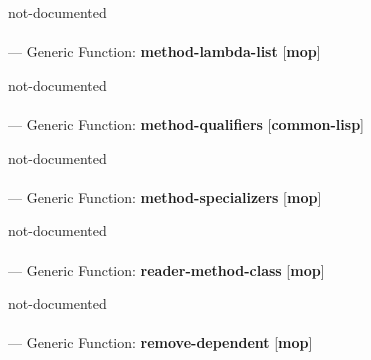 \begin{adjustwidth}{5em}{5em}
not-documented
\end{adjustwidth}

\paragraph{}
\label{MOP:METHOD-LAMBDA-LIST}
--- Generic Function: \textbf{method-lambda-list} [\textbf{mop}] \textit{}

\begin{adjustwidth}{5em}{5em}
not-documented
\end{adjustwidth}

\paragraph{}
\label{COMMON-LISP:METHOD-QUALIFIERS}
--- Generic Function: \textbf{method-qualifiers} [\textbf{common-lisp}] \textit{}

\begin{adjustwidth}{5em}{5em}
not-documented
\end{adjustwidth}

\paragraph{}
\label{MOP:METHOD-SPECIALIZERS}
--- Generic Function: \textbf{method-specializers} [\textbf{mop}] \textit{}

\begin{adjustwidth}{5em}{5em}
not-documented
\end{adjustwidth}

\paragraph{}
\label{MOP:READER-METHOD-CLASS}
--- Generic Function: \textbf{reader-method-class} [\textbf{mop}] \textit{}

\begin{adjustwidth}{5em}{5em}
not-documented
\end{adjustwidth}

\paragraph{}
\label{MOP:REMOVE-DEPENDENT}
--- Generic Function: \textbf{remove-dependent} [\textbf{mop}] \textit{}

